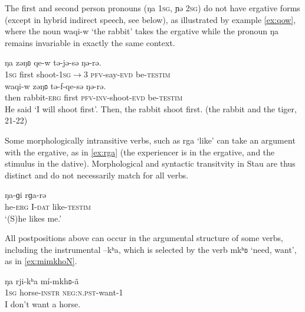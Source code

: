 \documentclass[oneside,a4paper,11pt]{article}
\newcommand{\ipa}[1]{{\phon #1}} %
\begin{document}
The first and second person pronouns (\ipa{ŋa} \textsc{1sg}, \ipa{ɲə} \textsc{2sg}) do not have ergative forms (except in hybrid indirect speech, see below), as illustrated by example \ref{ex:qow}, where the noun \ipa{waqi-w}  `the rabbit' takes the ergative while the pronoun \ipa{ŋa} remains invariable in exactly the same context.
 \begin{exe}
\ex \label{ex:qow}
\gll
\ipa{ŋa} 	\ipa{zəŋʚ} 	\ipa{qe-w} \ipa{tə-jə-sə} 	\ipa{ŋə-rə.} \\
\textsc{1sg} first shoot-\textsc{1sg$\rightarrow$3} \textsc{pfv}-say-\textsc{evd} be-\textsc{testim}\\
\gll \ipa{tɕʰəge,} 	\ipa{waqi-w} 	\ipa{zəŋʚ} 	\ipa{tə-f-qe-sə} 	\ipa{ŋə-rə.} 	\\
then rabbit-\textsc{erg} first \textsc{pfv-inv}-shoot-\textsc{evd} be-\textsc{testim}\\
\glt He said `I will shoot first'. Then, the rabbit shoot first. (the rabbit and the tiger, 21-22)
\end{exe}

Some morphologically intransitive verbs, such as \ipa{rga} `like' can take an argument with the ergative, as in \ref{ex:rga} (the experiencer is in the ergative, and the stimulus in the dative). Morphological and syntactic transitvity in Stau are thus distinct and do not necessarily match for all verbs.

 \begin{exe}
\ex \label{ex:rga}
\gll \ipa{tə-w}  	\ipa{ŋa-ɡi}  	\ipa{rɡa-rə}  
 \\
he-\textsc{erg} I-\textsc{dat} like-\textsc{testim} \\
\glt `(S)he likes me.'
\end{exe}

All postpositions above can occur in the argumental structure of some verbs, including the instrumental \ipa{--kʰa}, which is selected by the verb \ipa{mkʰʚ} `need, want', as in \ref{ex:mimkhoN}.

 \begin{exe}
\ex \label{ex:mimkhoN}
\gll
\ipa{ŋa} 	\ipa{rji-kʰa} 	\ipa{mí-mkhʚ-ã} \\
\textsc{1sg} horse-\textsc{instr} \textsc{neg:n.pst}-want-1 \\
\glt I don't want a horse.
\end{exe}

%	

\end{document}
